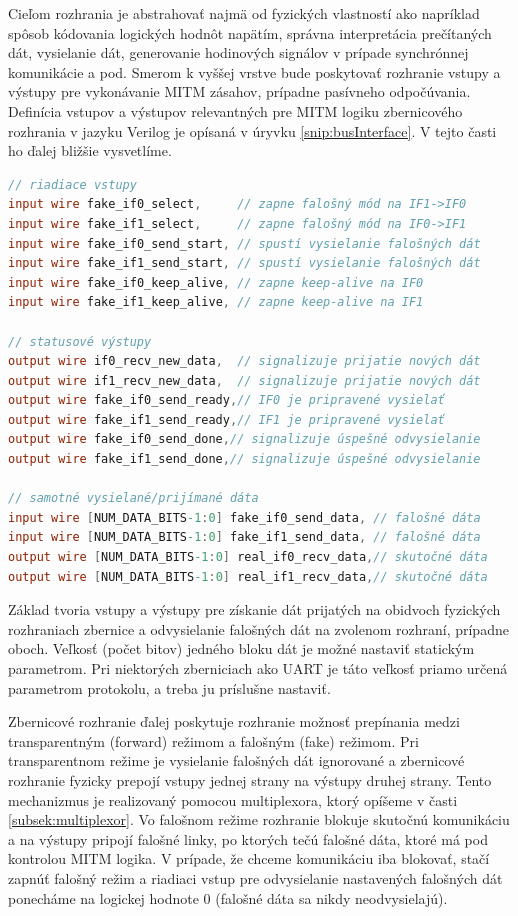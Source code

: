 Cieľom rozhrania je abstrahovať najmä od fyzických vlastností ako napríklad spôsob kódovania logických hodnôt napätím, správna interpretácia prečítaných dát, vysielanie dát, generovanie hodinových signálov v prípade synchrónnej komunikácie a pod. Smerom k vyššej vrstve bude poskytovať rozhranie vstupy a výstupy pre vykonávanie MITM zásahov, prípadne pasívneho odpočúvania. Definícia vstupov a výstupov relevantných pre MITM logiku zbernicového rozhrania v jazyku Verilog je opísaná v úryvku \ref{snip:busInterface}. V tejto časti ho ďalej bližšie vysvetlíme.

\begin{lstlisting}[float,language=Verilog,caption={Definícia vstupov a výstupov zbernicového rozhrania pre MITM logiku. Parameter NUM\_DATA\_BITS nastaví veľkosť bloku prijímaných/vysielaných dát.},label=snip:busInterface]
// riadiace vstupy
input wire fake_if0_select,     // zapne falošný mód na IF1->IF0
input wire fake_if1_select,     // zapne falošný mód na IF0->IF1
input wire fake_if0_send_start, // spustí vysielanie falošných dát
input wire fake_if1_send_start, // spustí vysielanie falošných dát
input wire fake_if0_keep_alive, // zapne keep-alive na IF0
input wire fake_if1_keep_alive, // zapne keep-alive na IF1

// statusové výstupy
output wire if0_recv_new_data,  // signalizuje prijatie nových dát
output wire if1_recv_new_data,  // signalizuje prijatie nových dát
output wire fake_if0_send_ready,// IF0 je pripravené vysielať   
output wire fake_if1_send_ready,// IF1 je pripravené vysielať   
output wire fake_if0_send_done,// signalizuje úspešné odvysielanie
output wire fake_if1_send_done,// signalizuje úspešné odvysielanie

// samotné vysielané/prijímané dáta
input wire [NUM_DATA_BITS-1:0] fake_if0_send_data, // falošné dáta
input wire [NUM_DATA_BITS-1:0] fake_if1_send_data, // falošné dáta
output wire [NUM_DATA_BITS-1:0] real_if0_recv_data,// skutočné dáta
output wire [NUM_DATA_BITS-1:0] real_if1_recv_data,// skutočné dáta
\end{lstlisting}

Základ tvoria vstupy a výstupy pre získanie dát prijatých na obidvoch fyzických rozhraniach zbernice a odvysielanie falošných dát na zvolenom rozhraní, prípadne oboch. Veľkosť (počet bitov) jedného bloku dát je možné nastaviť statickým parametrom. Pri niektorých zberniciach ako UART je táto veľkosť priamo určená parametrom protokolu, a treba ju príslušne nastaviť.

Zbernicové rozhranie ďalej poskytuje rozhranie možnosť prepínania medzi transparentným (forward) režimom a falošným (fake) režimom. Pri transparentnom režime je vysielanie falošných dát ignorované a zbernicové rozhranie fyzicky prepojí vstupy jednej strany na výstupy druhej strany. Tento mechanizmus je realizovaný pomocou multiplexora, ktorý opíšeme v časti \ref{subsek:multiplexor}. Vo falošnom režime rozhranie blokuje skutočnú komunikáciu a na výstupy pripojí falošné linky, po ktorých tečú falošné dáta, ktoré má pod kontrolou MITM logika. V prípade, že chceme komunikáciu iba blokovať, stačí zapnúť falošný režim a riadiaci vstup pre odvysielanie nastavených falošných dát ponecháme na logickej hodnote 0 (falošné dáta sa nikdy neodvysielajú).

